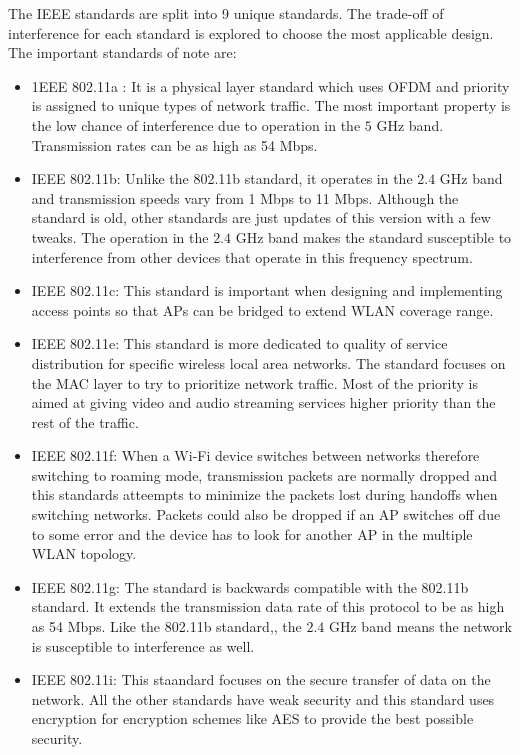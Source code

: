 The IEEE standards are split into 9 unique standards. The trade-off of interference for each standard is explored to choose the most applicable design. The important standards of note are:
\begin{itemize}
	\item 1EEE 802.11a : It is a physical layer standard which uses OFDM and priority is assigned to unique types of network traffic. The most important property is the low chance of interference due to operation in the $5$ GHz band. Transmission rates can be as high as 54 Mbps.
	\item IEEE 802.11b: Unlike the 802.11b standard, it operates in the $2.4$ GHz band and transmission speeds vary from 1 Mbps to 11 Mbps. Although the standard is old, other standards are just updates of this version with a few tweaks. The operation in the $2.4$ GHz band makes the standard susceptible to interference from other devices that operate in this frequency spectrum.
	\item IEEE 802.11c: This standard is important when designing and implementing access points so that APs can be bridged to extend WLAN coverage range.
	\item IEEE 802.11e: This standard is more dedicated to quality of service distribution for specific wireless local area networks. The standard focuses on the MAC layer to try to prioritize network traffic. Most of the priority is aimed at giving video and audio streaming services higher priority than the rest of the traffic. 
	\item IEEE 802.11f: When a Wi-Fi device switches between networks therefore switching to roaming mode, transmission packets are normally dropped and this standards atteempts to minimize the packets lost during handoffs when switching networks. Packets could also be dropped if an AP switches off due to some error and the device has to look for another AP in the multiple WLAN topology. 
	\item  IEEE 802.11g: The standard is backwards compatible with the 802.11b standard. It extends the transmission data rate of this protocol to be as high as 54 Mbps. Like the 802.11b standard,, the $2.4$ GHz band means the network is susceptible to interference as well.  
	\item IEEE 802.11i: This staandard focuses on the secure transfer of data on the network. All the other standards have weak security and this standard uses encryption for encryption schemes like AES to provide the best possible security.
\end{itemize}

